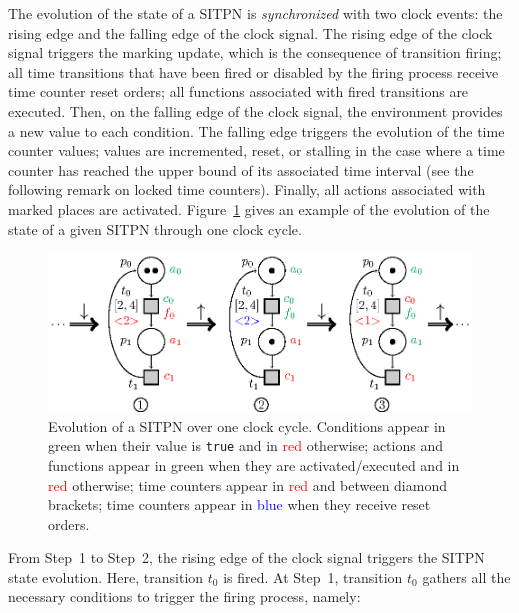 \documentclass[pdflatex,sn-mathphys]{sn-jnl}%
\theoremstyle{thmstyleone}%
\theoremstyle{thmstyletwo}%
\theoremstyle{thmstylethree}%
\begin{document}
The evolution of the state of a SITPN is \textit{synchronized} with
two clock events: the rising edge and the falling edge of the clock
signal.
The rising edge of the clock signal triggers the marking update, which
is the consequence of transition firing; all time transitions that
have been fired or disabled by the firing process receive time counter
reset orders; all functions associated with fired transitions are
executed. Then, on the falling edge of the clock signal, the
environment provides a new value to each condition. The falling edge
triggers the evolution of the time counter values; values are
incremented, reset, or stalling in the case where a time counter has
reached the upper bound of its associated time interval (see the
following remark on locked time counters). Finally, all actions
associated with marked places are
activated. Figure~\ref{fig:sitpn-state-exec} gives an example of the
evolution of the state of a given SITPN through one clock cycle. %

\begin{figure}[H]
  \centering
  \includegraphics[keepaspectratio=true, width=.9\textwidth]{sitpn-state-evol.eps}
  \caption[Evolution of an SITPN over one clock cycle.]{Evolution of a
    SITPN over one clock cycle. Conditions appear in green when their
    value is \texttt{true} and in \textcolor{red}{red} otherwise;
    actions and functions appear in green  when they are
    activated/executed and in \textcolor{red}{red} otherwise; time
    counters appear in \textcolor{red}{red} and between diamond
    brackets; time counters appear in \textcolor{blue}{blue} when they
    receive reset orders.}
  \label{fig:sitpn-state-exec}
\end{figure}

From Step~1 to Step~2, the rising edge of the clock signal triggers
the SITPN state evolution. Here, transition $t_0$ is fired. At Step~1,
transition $t_0$ gathers all the necessary conditions to trigger the
firing process, namely:
\end{document}
